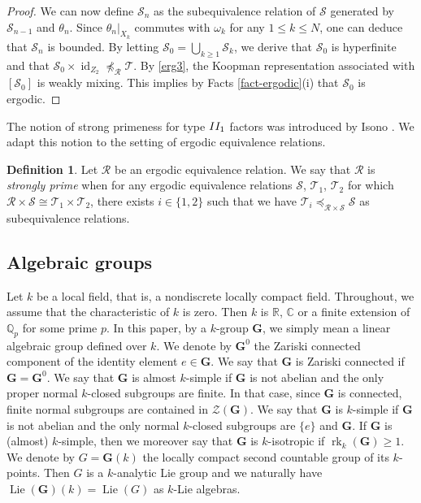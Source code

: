 \documentclass[11pt]{amsart}
\numberwithin{equation}{section}
\theoremstyle{plain}
\theoremstyle{definition}
\newtheorem{defn}[thm]{Definition}
\newcommand{\R}{\mathbb{R}}
\newcommand{\C}{\mathbb{C}}
\newcommand{\id}{\operatorname{id}}
\newcommand{\rk}{\operatorname{rk}}
\newcommand{\Lie}{\operatorname{Lie}}
\begin{document}
\begin{proof}
We can now define $\mathscr S_n$ as the subequivalence relation of $\mathscr S$ generated by $\mathscr S_{n-1}$ and $\theta_n$. Since $\theta_n |_{X_k}$ commutes with $\omega_k$ for any $1\leq k\leq N$, one can deduce that
$\mathscr S_n$ is bounded. By letting $\mathscr S_0=\bigcup_{k\ge 1}\mathscr S_k$, we derive that $\mathscr S_0$ is hyperfinite and that $\mathscr S_0 \times \id_{Z_2}\npreceq_{\mathscr R}  \mathscr T$. By \eqref{erg3}, the Koopman representation associated with $[\mathscr S_0]$ is weakly mixing. This implies by Facts \ref{fact-ergodic}(i) that $\mathscr S_0$ is ergodic.
\end{proof}



The notion of strong primeness for type ${\rm II_1}$ factors was introduced by Isono \cite{Is16}. We adapt this notion to the setting of ergodic equivalence relations.

\begin{defn}\label{defn-strong-primeness}
Let $\mathscr R$ be an ergodic equivalence relation. We say that $\mathscr R$ is {\em strongly prime} when for any ergodic equivalence relations $\mathscr S$, $\mathscr T_1$, $\mathscr T_2$ for which $\mathscr R \times \mathscr S \cong \mathscr T_1 \times \mathscr T_2$, there exists $i \in \{1, 2\}$ such that we have $\mathscr T_i \preceq_{\mathscr R \times \mathscr S} \mathscr S$ as subequivalence relations. 
\end{defn}


\subsection{Algebraic groups}

Let $k$ be a local field, that is, a nondiscrete locally compact field. Throughout, we assume that the characteristic of $k$ is zero. Then $k$ is $\R$, $\C$ or a finite extension of $\mathbb Q_p$ for some prime $p$. In this paper, by a $k$-group $\mathbf G$, we simply mean a linear algebraic group defined over $k$. We denote by $\mathbf G^0$ the Zariski connected component of the identity element $e \in \mathbf G$. We say that $\mathbf G$ is Zariski connected if $\mathbf G = \mathbf G^0$. We say that $\mathbf G$ is almost $k$-simple if $\mathbf G$ is not abelian and the only proper normal $k$-closed subgroups are finite. In that case, since $\mathbf G$ is connected, finite normal subgroups are contained in $\mathscr Z(\mathbf G)$. We say that $\mathbf G$ is $k$-simple if $\mathbf G$ is not abelian and the only normal $k$-closed subgroups are $\{e\}$ and $\mathbf G$. If $\mathbf G$ is (almost) $k$-simple, then we moreover say that $\mathbf G$ is $k$-isotropic if $\rk_k(\mathbf G) \geq 1$. We denote by $G = \mathbf G(k)$ the locally compact second countable group of its $k$-points. Then $G$ is a $k$-analytic Lie group and we naturally have $\Lie(\mathbf G)(k) = \Lie(G)$ as $k$-Lie algebras.
\end{document}
